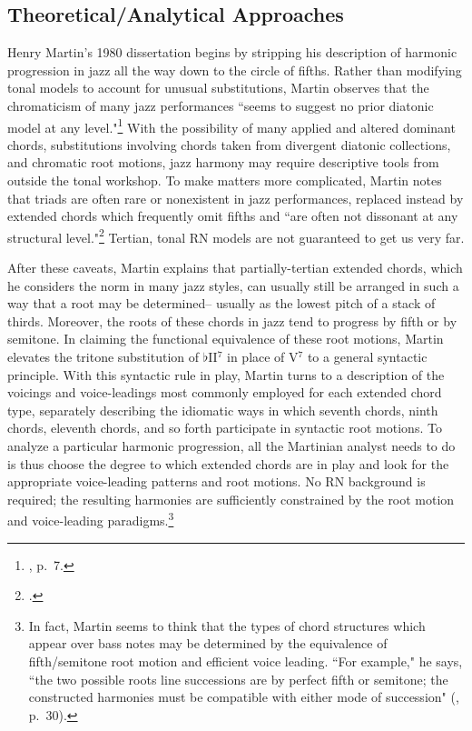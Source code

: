 \subsection{Theoretical/Analytical Approaches}
Henry Martin's 1980 dissertation begins by stripping his description of harmonic progression in jazz all the way down to the circle of fifths.  Rather than modifying tonal models to account for unusual substitutions, Martin observes that the chromaticism of many jazz performances ``seems to suggest no prior diatonic model at any level."\footnote{\cite{martin1980}, p.\ 7.}  With the possibility of many applied and altered dominant chords, substitutions involving chords taken from divergent diatonic collections, and chromatic root motions, jazz harmony may require descriptive tools from outside the tonal workshop.  To make matters more complicated, Martin notes that triads are often rare or nonexistent in jazz performances, replaced instead by extended chords which frequently omit fifths and ``are often not dissonant at any structural level."\footnote{\cite{martin1980}.}  Tertian, tonal RN models are not guaranteed to get us very far.

After these caveats, Martin explains that partially-tertian extended chords, which he considers the norm in many jazz styles, can usually still be arranged in such a way that a root may be determined-- usually as the lowest pitch of a stack of thirds.  Moreover, the roots of these chords in jazz tend to progress by fifth or by semitone.  In claiming the functional equivalence of these root motions, Martin elevates the tritone substitution of $\flat$II$^7$ in place of V$^7$ to a general syntactic principle.  With this syntactic rule in play, Martin turns to a description of the voicings and voice-leadings most commonly employed for each extended chord type, separately describing the idiomatic ways in which seventh chords, ninth chords, eleventh chords, and so forth participate in syntactic root motions.  To analyze a particular harmonic progression, all the Martinian analyst needs to do is thus choose the degree to which extended chords are in play and look for the appropriate voice-leading patterns and root motions.  No RN background is required; the resulting harmonies are sufficiently constrained by the root motion and voice-leading paradigms.\footnote{In fact, Martin seems to think that the types of chord structures which appear over bass notes may be determined by the equivalence of fifth/semitone root motion and efficient voice leading.  ``For example," he says, ``the two possible roots line successions are by perfect fifth or semitone; the constructed harmonies must be compatible with either mode of succession" (\cite{martin1980}, p.\ 30).}

